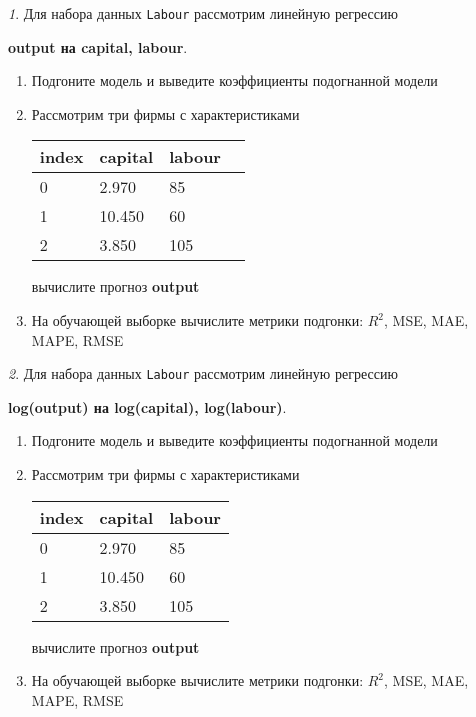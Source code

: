 \documentclass[12pt]{article}
\theoremstyle{remark}
\newtheorem{exercise}{}[section]
\begin{document}
\begin{exercise}
Для набора данных \texttt{Labour} рассмотрим линейную регрессию 
\begin{center}
	\textbf{output на capital, labour}.
\end{center}
\begin{enumerate}
	\item Подгоните модель и выведите коэффициенты подогнанной модели
	\item Рассмотрим три фирмы с характеристиками
	\begin{center}
		\begin{tabular}{|l||l||l|l|}\hline
			index & capital & labour \\ \hline\hline
			0 & 2.970 & 85 \\
			1 & 10.450 & 60  \\
			2 & 3.850 & 105 \\ \hline
		\end{tabular}
	\end{center}
	вычислите прогноз \textbf{output}
	\item На обучающей выборке вычислите метрики подгонки: \(R^2\), 
	MSE, MAE, MAPE, RMSE
\end{enumerate}
\end{exercise}

\begin{exercise}
Для набора данных \texttt{Labour} рассмотрим линейную регрессию 
\begin{center}
	\textbf{log(output) на log(capital), log(labour)}.
\end{center}
\begin{enumerate}
	\item Подгоните модель и выведите коэффициенты подогнанной модели
	\item Рассмотрим три фирмы с характеристиками
	\begin{center}
		\begin{tabular}{|l||l|l|}\hline
			index & capital & labour \\ \hline\hline
			0 & 2.970 & 85 \\
			1 & 10.450 & 60  \\
			2 & 3.850 & 105 \\ \hline
		\end{tabular}
	\end{center}
	вычислите прогноз \textbf{output}
	\item На обучающей выборке вычислите метрики подгонки: \(R^2\), 
	MSE, MAE, MAPE, RMSE
\end{enumerate}
\end{exercise}
\end{document}

